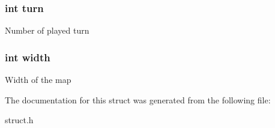 \subsubsection[{\texorpdfstring{turn}{turn}}]{\setlength{\rightskip}{0pt plus 5cm}int turn}\hypertarget{struct___map_aaefa47f4fdf865c2358c22b542a993e4}{}\label{struct___map_aaefa47f4fdf865c2358c22b542a993e4}
Number of played turn 
\subsubsection[{\texorpdfstring{width}{width}}]{\setlength{\rightskip}{0pt plus 5cm}int width}\hypertarget{struct___map_a2474a5474cbff19523a51eb1de01cda4}{}\label{struct___map_a2474a5474cbff19523a51eb1de01cda4}
Width of the map 

The documentation for this struct was generated from the following file\+:\begin{DoxyCompactItemize}
\item 
struct.\+h\end{DoxyCompactItemize}
